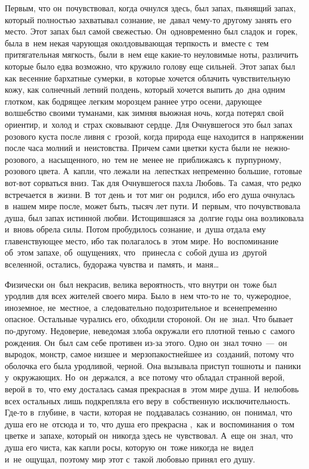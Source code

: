 Первым, что он~почувствовал, когда очнулся здесь, был запах, пьянящий запах, который полностью захватывал сознание, не~давал чему-то другому занять его место.
Этот запах был самой свежестью.
Он~одновременно был сладок и~горек, была в~нем некая чарующая околдовывающая терпкость и~вместе с~тем притягательная мягкость, были в~нем еще какие-то неуловимые ноты, различить которые было едва возможно, что кружило голову еще сильней.
Этот запах был как весенние бархатные сумерки, в~которые хочется облачить чувствительную кожу, как солнечный летний полдень, который хочется выпить до~дна одним глотком, как бодрящее легким морозцем раннее утро осени, дарующее волшебство своими туманами, как зимняя вьюжная ночь, когда потерял свой ориентир, и~холод и~страх сковывают сердце.
Для Очнувшегося это был запах розового куста после ливня с~грозой, когда природа еще находится в~напряжении после часа молний и~неистовства.
Причем сами цветки куста были не~нежно-розового, а~насыщенного, но~тем не~менее не~приближаясь к~пурпурному, розового цвета.
А~капли, что лежали на~лепестках непременно большие, готовые вот-вот сорваться вниз.
Так для Очнувшегося пахла Любовь.
Та~самая, что редко встречается в~жизни.
В~тот день и~тот миг он~родился, ибо его душа очнулась в~нашем мире после, может быть, тысяч лет пути.
И~первым, что почувствовала душа, был запах истинной любви.
Истощившаяся за~долгие годы она возликовала и~вновь обрела силы.
Потом пробудилось сознание, и~душа отдала ему главенствующее место, ибо так полагалось в~этом мире.
Но~воспоминание об~этом запахе, об~ощущениях, что ~принесла с~собой душа из~другой вселенной, остались, будоража чувства и~память, и~маня…
 
Физически он~был некрасив, велика вероятность, что внутри он~тоже был уродлив для всех жителей своего мира.
Было в~нем что-то не~то, чужеродное, иноземное, не~местное, а~следовательно подозрительное и~всенепременно опасное.
Остальные чурались его, обходили стороной.
Он~не~знал.
Что бывает по-другому.
Недоверие, неведомая злоба окружали его плотной тенью с~самого рождения.
Он~был сам себе противен из-за этого.
Одно он~знал точно~---~он выродок, монстр, самое низшее и~мерзопакостнейшее из~созданий, потому что оболочка его была уродливой, черной.
Она вызывала приступ тошноты и~паники у~окружающих.
Но~он~держался, а~все потому что обладал странной верой, верой в~то, что ему досталась самая прекрасная в~этом мире душа.
И~нелюбовь всех остальных лишь подкрепляла его веру в~собственную исключительность.
Где-то в~глубине, в~части, которая не~поддавалась сознанию, он~понимал, что душа его не~отсюда и~то, что душа его прекрасна ,~как и~воспоминания о~том цветке и~запахе, который он~никогда здесь не~чувствовал.
А~еще он~знал, что душа его чиста, как капли росы, которую он~тоже никогда не~видел и~не~ощущал, поэтому мир этот с~такой любовью принял его душу.

